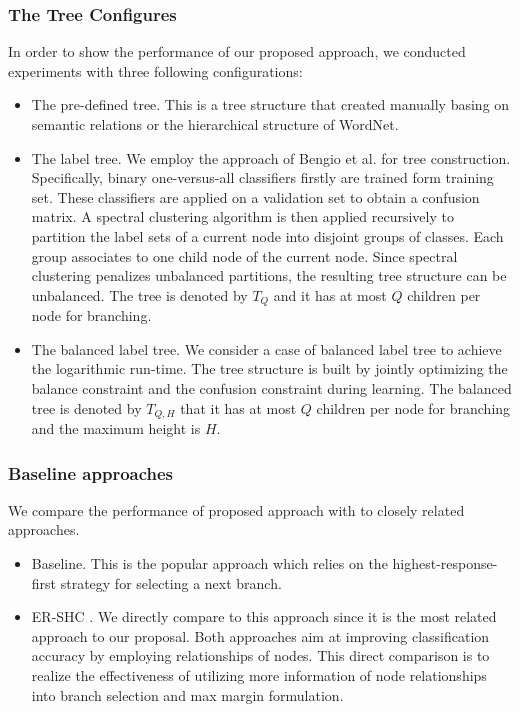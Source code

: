 \documentclass[review]{elsarticle}
\begin{document}
\subsubsection{The Tree Configures}
In order to show the performance of our proposed approach, we conducted experiments with three following configurations:
\begin{itemize}
\item The pre-defined tree. This is a tree structure that created manually basing on semantic relations or the hierarchical structure of WordNet. 

\item The label tree. We employ the approach of Bengio et al. \cite{Bengio.NIPS2010} for tree construction. Specifically, binary one-versus-all classifiers firstly are trained form training set. These classifiers are applied on a validation set to obtain a confusion matrix. A spectral clustering algorithm \cite{ng2002spectral} is then applied recursively to partition the label sets of a current node into disjoint groups of classes. Each group associates to one child node of the current node. Since spectral clustering penalizes unbalanced partitions, the resulting tree structure can be unbalanced. The tree is denoted by $T_Q$ and it has at most $Q$ children per node for branching.

\item The balanced label tree. We consider a case of balanced label tree \cite{MaiICIAP15} to achieve the logarithmic run-time. The tree structure is built by jointly optimizing the balance constraint and the confusion constraint during learning. The balanced tree is denoted by $T_{Q,H}$ that it has at most $Q$ children per node for branching and the maximum height is $H$.

\end{itemize}

\subsubsection{Baseline approaches}
We compare the performance of proposed approach with to closely related approaches.
\begin{itemize}
\item Baseline. This is the popular approach which relies on the highest-response-first strategy for selecting a next branch.
\item ER-SHC \cite{Zhu.CVIU2014}. We directly compare to this approach since it is the most related approach to our proposal. Both approaches aim at improving classification accuracy by employing relationships of nodes. This direct comparison is to realize the effectiveness of utilizing more information of node relationships into branch selection and max margin formulation.
\end{itemize}
\end{document}
